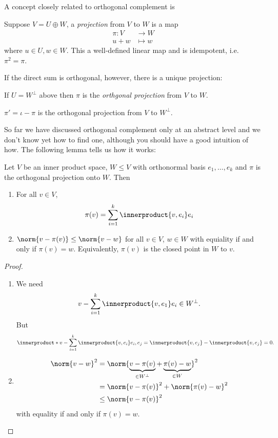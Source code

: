 \documentclass[a4paper]{article}
\newcommand*{\ip}{\innerproduct}
\theoremstyle{definition}
\begin{document}
A concept closely related to orthogonal complement is

\begin{definition}[Projection]
  Suppose \(V = U \oplus W\), a \emph{projection} from \(V\) to \(W\) is a map
  \begin{align*}
    \pi: V &\to W \\
    u + w &\mapsto w
  \end{align*}
  where \(u \in U, w \in W\). This a well-defined linear map and is idempotent, i.e.\ \(\pi^2 = \pi\).
\end{definition}

If the direct sum is orthogonal, however, there is a unique projection:

\begin{definition}
  If \(U = W^\perp\) above then \(\pi\) is the \emph{orthgonal projection} from \(V\) to \(W\).
\end{definition}

\begin{note}
  \(\pi' = \iota - \pi\) is the orthogonal projection from \(V\) to \(W^\perp\).
\end{note}

So far we have discussed orthogonal complement only at an abstract level and we don't know yet how to find one, although you should have a good intuition of how. The following lemma tells us how it works:

\begin{lemma}
  Let \(V\) be an inner product space, \(W \leq V\) with orthonormal basis \(e_1, \dots, e_k\) and \(\pi\) is the orthogonal projection onto \(W\). Then
  \begin{enumerate}
  \item For all \(v \in V\),
    \[
      \pi(v) = \sum_{i = 1}^k \ip{v, e_i} e_i
    \]
  \item \(\norm{v - \pi(v)} \leq \norm{v - w}\) for all \(v \in V\), \(w \in W\) with equiality if and only if \(\pi(v) = w\). Equivalently, \(\pi(v)\) is the closed point in \(W\) to \(v\).
  \end{enumerate}
\end{lemma}

\begin{proof}\leavevmode
  \begin{enumerate}
  \item We need
    \[
      v - \sum_{i = 1}^k \ip{v, e_1}e_i \in W^\perp.
    \]
    But
    \[
      \ip*{v - \sum_{i = 1}^k \ip{v, e_i}e_i, e_j} = \ip{v, e_j} - \ip{v, e_j} = 0.
    \]
  \item
    \begin{align*}
      \norm{v - w}^2 &= \norm{\underbrace{v - \pi(v)}_{\in W^\perp} + \underbrace{\pi(v) - w}_{\in W}}^2 \\
                     &= \norm{v - \pi(v)}^2 + \norm{\pi(v) - w}^2 \\
                     &\leq \norm{v - \pi(v)}^2
    \end{align*}
    with equality if and only if \(\pi(v) = w\).
  \end{enumerate}
\end{proof}
\end{document}
